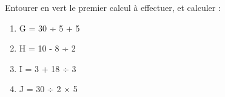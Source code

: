 
\begin{exercice}\label{exosmath-0729}

    Entourer en vert le premier calcul à effectuer, et calculer :
    \begin{multicols}{2}
        \begin{enumerate}
\item
G = 30 ÷ 5 + 5
\item
H = 10 - 8 ÷ 2
\item
I = 3 + 18 ÷ 3
\item
J = 30 ÷ 2 × 5
        \end{enumerate}
    \end{multicols}

\end{exercice}
